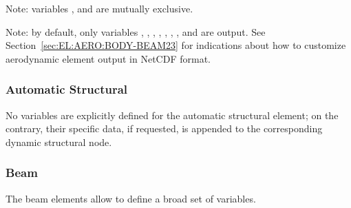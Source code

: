 \bigskip
\noindent
Note: variables ,  and 
are mutually exclusive.

\bigskip
\noindent
Note: by default, only variables
,
,
,
,
,
,
,
and  are output.
See Section~\ref{sec:EL:AERO:BODY-BEAM23} for indications
about how to customize aerodynamic element output in NetCDF format.


\subsubsection{Automatic Structural}
\label{sec:NetCDF:Elem:Automatic Structural}
No variables are explicitly defined for the automatic structural
element; on the contrary, their specific data, if requested,
is appended to the corresponding dynamic structural node.


\subsubsection{Beam}
\label{sec:NetCDF:Elem:Beam}

The beam elements allow to define a broad set of variables.


